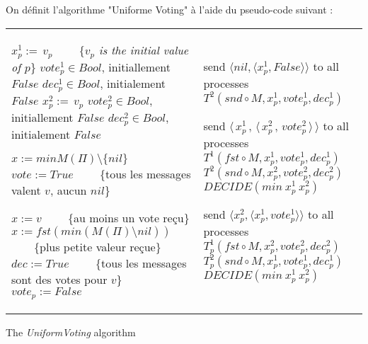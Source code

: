\documentclass{article}
\begin{document}
On définit l'algorithme "Uniforme Voting" à l'aide du pseudo-code suivant :
\begin{algorithm}[htb]
\scriptsize{
\begin{distribalgo}[1]
\begin{tabular}{ll}
\begin{minipage}{41em}


\INDENT{\textbf{Initialization:}}
	\STATE $x^1_p :=\, v_p$ ~~~~\{\emph{$v_p$ is the initial value of $p$}\}
	\STATE $vote^1_p \in Bool$, initiallement $False$
	\STATE $dec^1_p \in Bool$, initialement $False$
	\BLANK
	\STATE $x^2_p :=\, v_p$
	\STATE $vote^2_p \in Bool$, initiallement $False$
	\STATE $dec^2_p \in Bool$, initialement $False$

\ENDINDENT
\BLANK

\INDENT{\textbf{Fonctions sur une instance}}
	\INDENT{$T^1_p(M, ref ~ x, ref ~ vote, ref ~ dec):$}
		\STATE $ x := min M(\Pi) \setminus \{nil\}$ 
		\IF{$M(\Pi) = \{v\}$} 
			\STATE $vote := True$ ~~~~\{tous les messages valent $v$, aucun $nil$\}
		\ENDIF
	\ENDINDENT
	\BLANK

	\INDENT{$T^2_p(M, ref ~ x, ref ~ vote, ref ~ dec):$}

		\IF{$\exists v \in V, q \in \Pi, M(q) = \langle v, True \rangle$}
			\STATE $x := v$ ~~~~\{au moins un vote reçu\}
		\ELSE
			\STATE $x := fst (min (M(\Pi) \setminus {nil}))$ ~~~~\{plus petite valeur reçue\}
		\ENDIF
		\IF{$M(\Pi) = \{\langle v, True \rangle\}$}
			\STATE $dec := True$ ~~~~\{tous les messages sont des votes pour $v$\}
		\ENDIF
		\STATE $vote_p := False$
	\ENDINDENT
\ENDINDENT

\end{minipage}
&
\begin{minipage}{31em}

\INDENT{\textbf{Round $r=0\,$:}}
	\INDENT{$S_p:$}
		\STATE send $\langle nil, \langle  x^1_p , False \rangle \rangle$ to all processes
	\ENDINDENT
	\INDENT{$T_p(M):$}
		\STATE $T^2(snd \circ M, x^1_p, vote^1_p, dec^1_p)$
	\ENDINDENT
\ENDINDENT

\INDENT{\textbf{Round $r=2\phi+1\,$:}}
	\INDENT{$S_p:$}
		\STATE send $\langle\, x^1_p\, ,\, \langle \, x^2_p \, ,\, vote^2_p \, \rangle \, \rangle$ to all processes
	\ENDINDENT
	\BLANK
	\INDENT{$T_p(M):$}
		\STATE $T^1(fst \circ M, x^1_p, vote^1_p, dec^1_p)$
		\STATE $T^2(snd \circ M, x^2_p, vote^2_p, dec^2_p)$
		\IF{$dec^1_p \wedge dec^2_p $}
			\STATE $DECIDE(min ~ x^1_p ~ x^2_p)$
		\ENDIF
	\ENDINDENT
\ENDINDENT

\INDENT{\textbf{Round $r=2\phi+2\,$:}}
	\INDENT{$S_p:$}
		\STATE send $\langle x^2_p , \langle x^1_p, vote^1_p \rangle \rangle$ to all processes
	\ENDINDENT
	\BLANK
	\INDENT{$T_p(M)$}
		\STATE $T^1_p(fst \circ M, x_p^2, vote^2_p, dec^2_p)$
		\STATE $T^2_p(snd \circ M, x_p^1, vote^1_p, dec^1_p)$
		\IF{$dec^1_p \wedge dec^2_p $}
			\STATE $DECIDE(min ~ x^1_p ~ x^2_p)$
		\ENDIF
	\ENDINDENT
\ENDINDENT

\end{minipage}
\end{tabular}

\caption{The {\em UniformVoting} algorithm}
\label{unifvotfig}
\end{distribalgo}
}
\end{algorithm}
\end{document}
